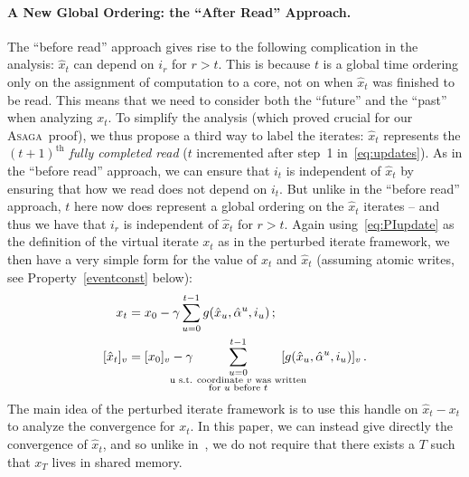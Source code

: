 \documentclass[twoside]{article}
\newcommand{\stepsize}{\gamma}
\newcommand{\ASAGA}{\textsc{Asaga}}
\begin{document}
\paragraph{A New Global Ordering: the ``After Read'' Approach.}
The ``before read'' approach gives rise to the following complication in the analysis: $\hat{x}_t$ can depend on $i_r$ for $r > t$. 
This is because $t$ is a global time ordering only on the assignment of computation to a core, not on when  $\hat{x}_t$ was finished to be read. 
This means that we need to consider both the ``future'' and the ``past'' when analyzing $x_t$. 
To simplify the analysis (which proved crucial for our \ASAGA\ proof), we thus propose a third way to label the iterates: $\hat{x}_t$ represents the $(t+1)^{\mathrm{th}}$ \emph{fully completed read} ($t$ incremented after step~1 in~\eqref{eq:updates}). 
As in the ``before read'' approach, we can ensure that $i_t$ is independent of $\hat{x}_t$ by ensuring that how we read does not depend on $i_t$. 
But unlike in the ``before read'' approach, $t$ here now does represent a global ordering on the $\hat{x}_t$ iterates -- and thus we have that $i_r$ is independent of $\hat{x}_t$ for $r > t$. 
Again using~\eqref{eq:PIupdate} as the definition of the virtual iterate $x_t$ as in the perturbed iterate framework, we then have a very simple form for the value of $x_t$ and $\hat{x}_t$ (assuming atomic writes, see Property~\ref{eventconst} below):
\begin{equation} \label{eq:xhatUpdates}
\begin{aligned}
x_t &= x_0 - \stepsize \sum_{u = 0}^{t-1} g(\hat x_u, \hat \alpha^u, i_u) \, ;
\\
[\hat{x}_t]_v &= [x_0]_v - \stepsize  
\mkern-36mu \sum_{\substack{u = 0 \\ 
		\text{u s.t. coordinate $v$ was written}\\ 
		\text{for $u$ before $t$} } 
}^{t-1} \mkern-36mu  [g(\hat x_u, \hat \alpha^u, i_u)]_v \, .
\end{aligned}
\end{equation}
The main idea of the perturbed iterate framework is to use this handle on $\hat x_t - x_t$ to analyze the convergence for $x_t$. 
In this paper, we can instead give directly the convergence of $\hat x_t$, and so unlike in~\citet{mania}, we do not require that there exists a $T$ such that $x_T$ lives in shared memory.
\end{document}
